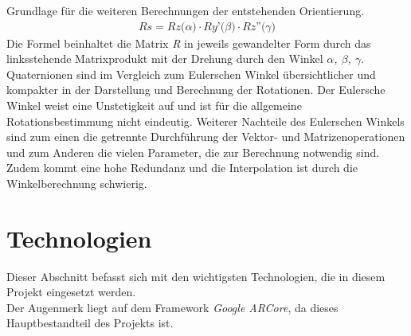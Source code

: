 Grundlage für die weiteren Berechnungen der entstehenden Orientierung. \cite{quaternionRichter.2020m}
\begin{align}
    \textit{Rs} = \textit{Rz($\alpha$)} \cdot \textit{Ry'($\beta$)} \cdot \textit{Rz''($\gamma$)}
\end{align}
Die Formel beinhaltet die Matrix \textit{R} in jeweils gewandelter Form durch das linksstehende Matrixprodukt mit der Drehung durch den Winkel \textit{$\alpha$, $\beta$, $\gamma$}.
\\ 
\linebreak
Quaternionen sind im Vergleich zum Eulerschen Winkel übersichtlicher und kompakter in der Darstellung und Berechnung der Rotationen. \cite{quaternionRichter.2020m} 
Der Eulersche Winkel weist eine Unstetigkeit auf und ist für die allgemeine Rotationsbestimmung nicht eindeutig. \cite{euler.2000} Weiterer Nachteile des 
Eulerschen Winkels sind zum einen die getrennte Durchführung der Vektor- und Matrizenoperationen und zum Anderen die vielen Parameter, die zur Berechnung notwendig sind. 
Zudem kommt eine hohe Redundanz und die Interpolation ist durch die Winkelberechnung schwierig. \cite{quaternionRichter.2020m} 

\section{Technologien}
\label{chap:Technologien}                       %
Dieser Abschnitt befasst sich mit den wichtigsten Technologien, die in diesem Projekt eingesetzt werden. 
\\ 
Der Augenmerk liegt auf dem Framework \textit{Google ARCore}, da dieses Hauptbestandteil des Projekts ist. 
